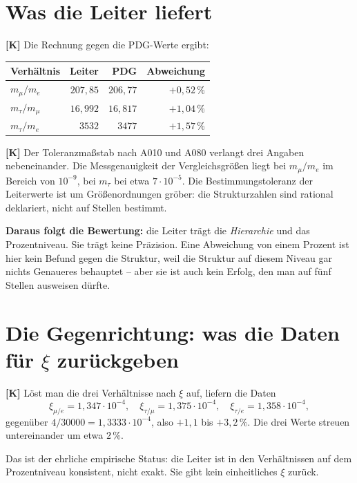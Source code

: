 \section{Was die Leiter liefert}

\textbf{[K]} Die Rechnung gegen die PDG-Werte ergibt:

\begin{center}
\begin{tabular}{lrrr}
\hline
Verhältnis & Leiter & PDG & Abweichung \\
\hline
$m_\mu/m_e$    & $207{,}85$ & $206{,}77$ & $+0{,}52\,\%$ \\
$m_\tau/m_\mu$ & $16{,}992$ & $16{,}817$ & $+1{,}04\,\%$ \\
$m_\tau/m_e$   & $3532$     & $3477$     & $+1{,}57\,\%$ \\
\hline
\end{tabular}
\end{center}

\textbf{[K]} Der Toleranzmaßstab nach A010 und A080 verlangt drei Angaben
nebeneinander. Die Messgenauigkeit der Vergleichsgrößen liegt bei $m_\mu/m_e$
im Bereich von $10^{-9}$, bei $m_\tau$ bei etwa $7\cdot10^{-5}$. Die
Bestimmungstoleranz der Leiterwerte ist um Größenordnungen gröber: die
Strukturzahlen sind rational deklariert, nicht auf Stellen bestimmt.

\textbf{Daraus folgt die Bewertung:} die Leiter trägt die \emph{Hierarchie} und
das Prozentniveau. Sie trägt keine Präzision. Eine Abweichung von einem Prozent
ist hier kein Befund gegen die Struktur, weil die Struktur auf diesem Niveau gar
nichts Genaueres behauptet -- aber sie ist auch kein Erfolg, den man auf fünf
Stellen ausweisen dürfte.

\section{Die Gegenrichtung: was die Daten für $\xi$ zurückgeben}

\textbf{[K]} Löst man die drei Verhältnisse nach $\xi$ auf, liefern die Daten
\[
  \xi_{\mu/e} = 1{,}347\cdot10^{-4},\quad
  \xi_{\tau/\mu} = 1{,}375\cdot10^{-4},\quad
  \xi_{\tau/e} = 1{,}358\cdot10^{-4},
\]
gegenüber $4/30000 = 1{,}3333\cdot10^{-4}$, also $+1{,}1$ bis $+3{,}2\,\%$.
Die drei Werte streuen untereinander um etwa $2\,\%$.

Das ist der ehrliche empirische Status: die Leiter ist in den Verhältnissen auf
dem Prozentniveau konsistent, nicht exakt. Sie gibt kein einheitliches $\xi$
zurück.

